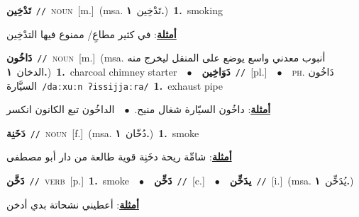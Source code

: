 \documentclass[10pt,a4paper,twoside]{article} %
\begin{document}
\begin{multicols}{2}
{\setlength\topsep{0pt}\textbf{\foreignlanguage{arabic}{تَدْخِين}}\ {\color{gray}\texttt{//}\color{black}}\ \textsc{noun}\ [m.]\ \color{gray}(msa. \foreignlanguage{arabic}{تَدْخِين}~\foreignlanguage{arabic}{\textbf{١.}})\color{black}\ \textbf{1.}~smoking\  \begin{flushright}\color{gray}\foreignlanguage{arabic}{\textbf{\underline{\foreignlanguage{arabic}{أمثلة}}}: في كثير مطاعِ/ ممنوع فيها التدْخِين}\end{flushright}\color{black}} \vspace{2mm}

{\setlength\topsep{0pt}\textbf{\foreignlanguage{arabic}{دَاخُون}}\ {\color{gray}\texttt{//}\color{black}}\ \textsc{noun}\ [m.]\ \color{gray}(msa. \foreignlanguage{arabic}{أنبوب معدني واسع يوضع على المنقل ليخرج منه الدخان}~\foreignlanguage{arabic}{\textbf{١.}})\color{black}\ \textbf{1.}~charcoal chimney starter\ \ $\bullet$\ \ \setlength\topsep{0pt}\textbf{\foreignlanguage{arabic}{دَوَاخِين}}\ {\color{gray}\texttt{//}\color{black}}\ [pl.]\ \ $\bullet$\ \ \textsc{ph.} \color{gray} \foreignlanguage{arabic}{دَاخُون السيَّارة}\color{black}\ {\color{gray}\texttt{/{\sffamily daːxuːn ʔissijjaːra}/}\color{black}}\ \textbf{1.}~exhaust pipe\  \begin{flushright}\color{gray}\foreignlanguage{arabic}{\textbf{\underline{\foreignlanguage{arabic}{أمثلة}}}: داخُون السيّارة شغال منيح.\ $\bullet$\ \  الداخُون تبع الكانون انكسر}\end{flushright}\color{black}} \vspace{2mm}

{\setlength\topsep{0pt}\textbf{\foreignlanguage{arabic}{دَخَنِة}}\ {\color{gray}\texttt{//}\color{black}}\ \textsc{noun}\ [f.]\ \color{gray}(msa. \foreignlanguage{arabic}{دُخّان}~\foreignlanguage{arabic}{\textbf{١.}})\color{black}\ \textbf{1.}~smoke\  \begin{flushright}\color{gray}\foreignlanguage{arabic}{\textbf{\underline{\foreignlanguage{arabic}{أمثلة}}}: شامِّة ريحة دخَنِة قوية طالعة من دار أبو مصطفى}\end{flushright}\color{black}} \vspace{2mm}

{\setlength\topsep{0pt}\textbf{\foreignlanguage{arabic}{دَخَّن}}\ {\color{gray}\texttt{//}\color{black}}\ \textsc{verb}\ [p.]\ \textbf{1.}~smoke\ \ $\bullet$\ \ \setlength\topsep{0pt}\textbf{\foreignlanguage{arabic}{دَخِّن}}\ {\color{gray}\texttt{//}\color{black}}\ [c.]\ \ $\bullet$\ \ \setlength\topsep{0pt}\textbf{\foreignlanguage{arabic}{يدَخِّن}}\ {\color{gray}\texttt{//}\color{black}}\ [i.]\ \color{gray}(msa. \foreignlanguage{arabic}{يُدَخِّن}~\foreignlanguage{arabic}{\textbf{١.}})\color{black}\  \begin{flushright}\color{gray}\foreignlanguage{arabic}{\textbf{\underline{\foreignlanguage{arabic}{أمثلة}}}: أعطيني نشحاتة بدي أدخن}\end{flushright}\color{black}} \vspace{2mm}


\end{multicols}
\end{document}
